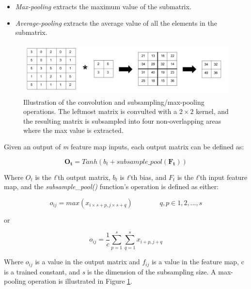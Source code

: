 \begin{itemize}
	\item \textit{Max-pooling} extracts the maximum value of the submatrix.
	\item \textit{Average-pooling} extracts the average value of all the elements in the submatrix.
\end{itemize}

\begin{figure}[h!]
  \centering
      \includegraphics[width=1.0\textwidth]{Figures/Background/Convolution-Maxpooling}
  \caption[Convolution and subsampling/max-pooling operation]{Illustration of the convolution and subsampling/max-pooling operations. The leftmost matrix is convulted with a $ 2 \times 2 $ kernel, and the resulting matrix is subsampled into four non-overlapping areas where the max value is extracted.}
  \label{fig_conv_ss_mp}
\end{figure}

Given an output of \textit{m} feature map inputs, each output matrix can be defined as:

\begin{equation}
	\mathbf{O_t} = Tanh(b_{t} + subsample\_pool(\mathbf{F_t}))
\end{equation}


Where $O_t$ is the \textit{t}'th output matrix, $ b_t $ is \textit{t}'th bias, and $F_t$ is the \textit{t}'th input feature map, and the \textit{subsample\_pool()} function's operation is defined as either:

\begin{equation}
o_{ij} = max(x_{i \times s+p, j \times s+q}) \qquad\qquad q,p \in 1, 2, \dots, s
\end{equation}

or

\begin{equation}
o_{ij} = \frac{1}{c} \sum_{p=1}^{s}\sum_{q=1}^{s} x_{i+p, j+q}
\end{equation}

Where $ o_{ij} $ is a value in the output matrix and $ f_{ij} $ is a value in the feature map, c is a trained constant, and \textit{s} is the dimension of the subsampling size. A max-pooling operation is illustrated in Figure \ref{fig_conv_ss_mp}.

